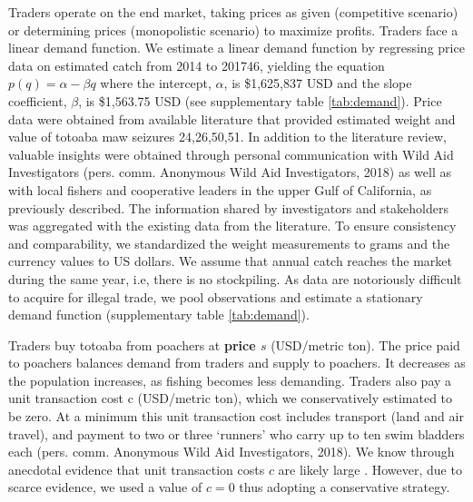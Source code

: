 Traders operate on the end market, taking prices as given (competitive scenario) or determining prices (monopolistic scenario) to maximize profits. Traders face a linear demand function. We estimate a linear demand function by regressing price data on estimated catch from 2014 to 201746, yielding the equation $p(q) = \alpha - \beta q$ where the intercept, $\alpha$, is \$1,625,837 USD and the slope coefficient, $\beta$, is \$1,563.75 USD (see supplementary table \ref{tab:demand}). Price data were obtained from available literature that provided estimated weight and value of totoaba maw seizures 24,26,50,51. In addition to the literature review, valuable insights were obtained through personal communication with Wild Aid Investigators (pers. comm. Anonymous Wild Aid Investigators, 2018) as well as with local fishers and cooperative leaders in the upper Gulf of California, as previously described. The information shared by investigators and stakeholders was aggregated with the existing data from the literature. To ensure consistency and comparability, we standardized the weight measurements to grams and the currency values to US dollars. We assume that annual catch reaches the market during the same year, i.e, there is no stockpiling. As data are notoriously difficult to acquire for illegal trade, we pool observations and estimate a stationary demand function (supplementary table \ref{tab:demand}).

Traders buy totoaba from poachers at \textbf{price $s$} (USD/metric ton). The price paid to poachers balances demand from traders and supply to poachers. It decreases as the population increases, as fishing becomes less demanding. Traders also pay a unit transaction cost c (USD/metric ton), which we conservatively estimated to be zero. At a minimum this unit transaction cost includes transport (land and air travel), and payment to two or three ‘runners’ who carry up to ten swim bladders each (pers. comm. Anonymous Wild Aid Investigators, 2018). We know through anecdotal evidence that unit transaction costs $c$ are likely large \citep{elephant_action_league_operation_2018}. However, due to scarce evidence, we used a value of $c=0$ thus adopting a conservative strategy.
